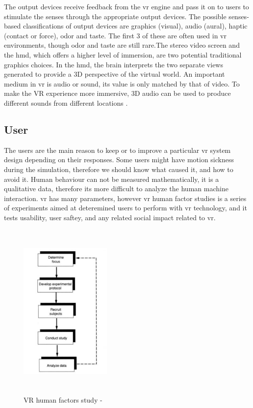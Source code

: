  The output devices receive feedback from the \acrshort{vr} engine and pass it on to users to stimulate the senses through the appropriate output devices. The possible senses-based classifications of output devices are graphics (visual), audio (aural), haptic (contact or force), odor and taste. The first 3 of these are often used in \acrshort{vr} environments, though odor and taste are still rare.The stereo video screen and the \acrfull{hmd}, which offers a higher level of immersion, are two potential traditional graphics choices. In the \acrshort{hmd}, the brain interprets the two separate views generated to provide a 3D perspective of the virtual world. An important medium in \acrshort{vr} is audio or sound, its value is only matched by that of video. To make the VR experience more immersive, 3D audio can be used to produce different sounds from different locations \citep{burdea2017virtual, Bamodu2013VirtualComponents}.



\subsection{User}

The users are the main reason to keep or to improve a particular \acrshort{vr} system design depending on their responses. Some users might have motion sickness during the simulation, therefore we should know what caused it, and how to avoid it. Human behaviour can not be measured mathematically, it is a qualitative data, therefore its more difficult to analyze the human machine interaction. \acrshort{vr} has many parameters, however \acrshort{vr} human factor studies is a series of experiments aimed at deteremined users to perform with \acrshort{vr} technology, and it tests usability, user saftey, and any related social impact related to \acrshort{vr}. 

\begin{figure}[ht]
    \centering
    \includegraphics[width=0.40\textwidth, height=250pt]{images/VRhf.png}
    \caption{VR human factors study - \citep{burdea2017virtual}}
    \label{fig:vrhf}
\end{figure}

